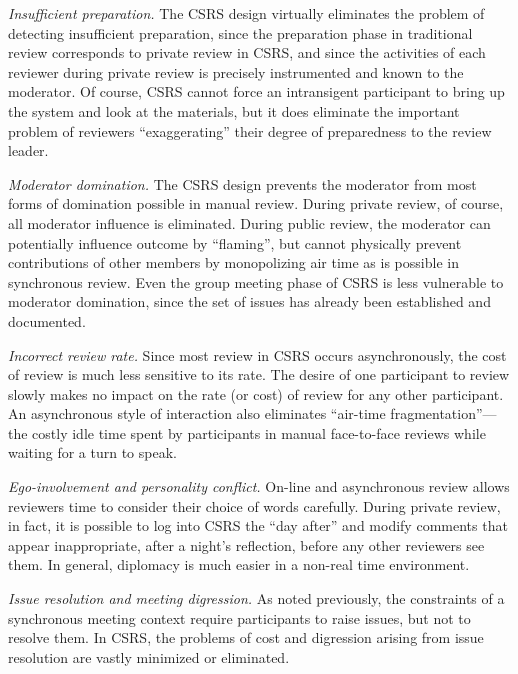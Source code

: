 \begin{itemizenoindent}
  
\item {\em Insufficient preparation.} The CSRS design virtually
  eliminates the problem of detecting insufficient preparation, since the
  preparation phase in traditional review corresponds to private review in
  CSRS, and since the activities of each reviewer during private review is
  precisely instrumented and known to the moderator.  Of course, CSRS
  cannot force an intransigent participant to bring up the system and look
  at the materials, but it does eliminate the important problem of
  reviewers ``exaggerating'' their degree of preparedness to the review
  leader.
  
\item {\em Moderator domination.} The CSRS design prevents the
  moderator from most forms of domination possible in manual review.
  During private review, of course, all moderator influence is eliminated.
  During public review, the moderator can potentially influence outcome by
  ``flaming'', but cannot physically prevent contributions of other members
  by monopolizing air time as is possible in synchronous review.  Even the
  group meeting phase of CSRS is less vulnerable to moderator domination,
  since the set of issues has already been established and documented.
  
\item {\em Incorrect review rate.} Since most review in CSRS occurs
  asynchronously, the cost of review is much less sensitive to its rate.
  The desire of one participant to review slowly makes no impact on the
  rate (or cost) of review for any other participant.  An asynchronous
  style of interaction also eliminates ``air-time fragmentation''---the
  costly idle time spent by participants in manual face-to-face reviews
  while waiting for a turn to speak.
  
\item {\em Ego-involvement and personality conflict.} On-line and
  asynchronous review allows reviewers time to consider their choice of
  words carefully.  During private review, in fact, it is possible to log
  into CSRS the ``day after'' and modify comments that appear
  inappropriate, after a night's reflection, before any other reviewers
  see them.  In general, diplomacy is much easier in a non-real time
  environment.
  
\item {\em Issue resolution and meeting digression.} As noted previously,
  the constraints of a synchronous meeting context require participants to
  raise issues, but not to resolve them.  In CSRS, the problems of cost and
  digression arising from issue resolution are vastly minimized or
  eliminated.  
  

\end{itemizenoindent}
